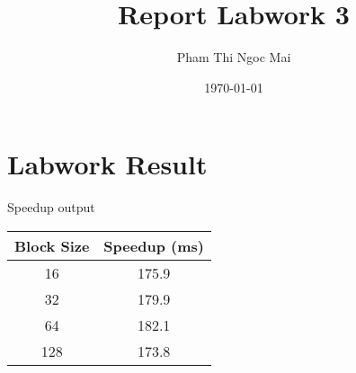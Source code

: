 \documentclass{article}
\title{Report Labwork 3}
\author{Pham Thi Ngoc Mai}
\date{\today}
\begin{document}
\maketitle

\section{Labwork Result}
Speedup output
\begin{center}
    \begin{tabular}{c|c}
        Block Size & Speedup (ms)  \\
        \hline
        16 & 175.9 \\
        32 & 179.9 \\
        64 & 182.1 \\
        128 & 173.8
    \end{tabular}
\end{center}
\end{document}
